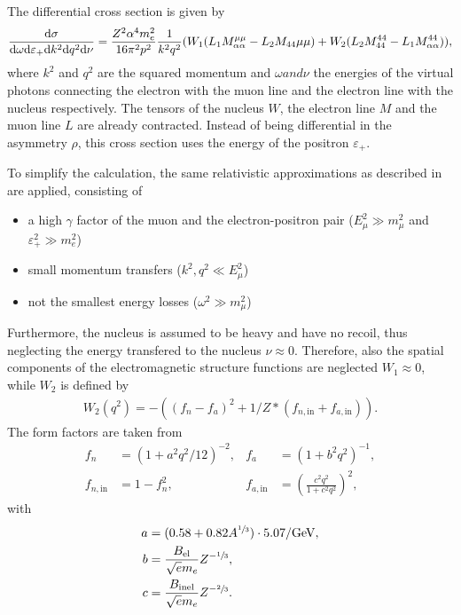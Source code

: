 The differential cross section is given by
\begin{align}
    \frac{\mathrm{d} \sigma}{\mathrm{d} \omega \mathrm{d} \varepsilon_+ \mathrm{d} k^2 \mathrm{d} q^2 \mathrm{d} \nu} =
        \frac{Z^2 \alpha^4 m_e^2}{16 \pi^2 p^2} \frac{1}{k^2 q^2}
        (W_1(L_1 M_{\alpha \alpha}^{\mu \mu} - L_2 M_{44}{\mu \mu})
        + W_2 (L_2 M_{44}^{44} - L_1 M_{\alpha \alpha}^{44})) ,
\end{align}
where $k^2$ and $q^2$ are the squared momentum and $\omega and \nu$ the energies of the virtual photons connecting the electron with the muon line and the electron line with the nucleus respectively.
The tensors of the nucleus $W$, the electron line $M$ and the muon line $L$ are already contracted.
Instead of being differential in the asymmetry $\rho$, this cross section uses the energy of the positron $\varepsilon_+$.

To simplify the calculation, the same relativistic approximations as described in \cite{Bugaev77} are applied, consisting of
\begin{itemize}
    \item a high $\gamma$ factor of the muon and the electron-positron pair ($E_\mu^2 \gg m_\mu^2$ and $\varepsilon_+^2 \gg m_e^2$)
    \item small momentum transfers ($k^2, q^2 \ll E_\mu^2$)
    \item not the smallest energy losses ($\omega^2 \gg m_\mu^2$)
\end{itemize}
Furthermore, the nucleus is assumed to be heavy and have no recoil, thus neglecting the energy transfered to the nucleus $\nu \approx 0$.
Therefore, also the spatial components of the electromagnetic structure functions are neglected $W_1 \approx 0$, while $W_2$ is defined by
\begin{align}
    W_2 (q^2) = -((f_n - f_a)^2 + 1/Z*(f_{n,\mathrm{in}} + f_{a,\mathrm{in}})) .
\end{align}
The form factors are taken from \cite{Tsai74, Andreev94Brems}
\begin{subequations}
\begin{align}
    f_n   &= (1 + a^2 q^2/12)^{-2}, %
    & f_a &= (1 + b^2 q^2)^{-1}, \\
    f_{n,\mathrm{in}}   &= 1 - f_n^2,
    & f_{a,\mathrm{in}} &= \left(\frac{c^2 q^2}{1 + c^2 q^2} \right)^2 ,
\end{align}
\end{subequations}
with
\begin{subequations}
\begin{align}
    a &= (0.58 + 0.82 A^{\sfrac13}) \cdot 5.07/\si{GeV},
    \\
    b &= \frac{B_{\mathrm{el}}}{\sqrt{e} m_e} Z^{-\sfrac13},
    \\
    c &= \frac{B_{\mathrm{inel}}}{\sqrt{e} m_e} Z^{-\sfrac23}.
\end{align}
\end{subequations}

